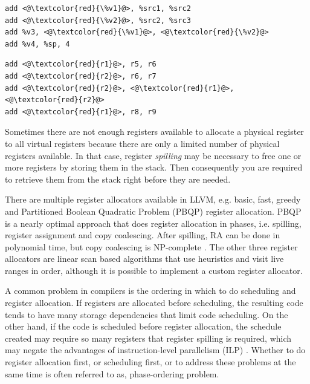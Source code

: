 \begin{center}
\begin{minipage}[t]{.4\textwidth}
\begin{lstlisting}
add <@\textcolor{red}{\%v1}@>, %src1, %src2
add <@\textcolor{red}{\%v2}@>, %src2, %src3
add %v3, <@\textcolor{red}{\%v1}@>, <@\textcolor{red}{\%v2}@>
add %v4, %sp, 4
\end{lstlisting}
\end{minipage}
\begin{minipage}[t]{.4\textwidth}
\begin{lstlisting}
add <@\textcolor{red}{r1}@>, r5, r6
add <@\textcolor{red}{r2}@>, r6, r7
add <@\textcolor{red}{r2}@>, <@\textcolor{red}{r1}@>, <@\textcolor{red}{r2}@>
add <@\textcolor{red}{r1}@>, r8, r9
\end{lstlisting}
\end{minipage}
\label{lst:ra_example}
\end{center}


Sometimes there are not enough registers available to allocate a physical register to all virtual registers because there are only a limited number of physical registers available. In that case, register \emph{spilling} may be necessary to free one or more registers by storing them in the stack. Then consequently you are required to retrieve them from the stack right before they are needed.

There are multiple register allocators available in LLVM, e.g. basic, fast, greedy and Partitioned Boolean Quadratic Problem (PBQP) register allocation. PBQP is a nearly optimal approach that does register allocation in phases, i.e. spilling, register assignment and copy coalescing. After spilling, RA can be done in polynomial time, but copy coalescing is NP-complete \cite{pbqp}. The other three register allocators are linear scan based algorithms that use heuristics and visit live ranges in order, although it is possible to implement a custom register allocator.


A common problem in compilers is the ordering in which to do scheduling and register allocation. If registers are allocated before scheduling, the resulting code tends to have many storage dependencies that limit code scheduling. On the other hand, if the code is scheduled before register allocation, the schedule created may require so many registers that register spilling is required, which may negate the advantages of instruction-level parallelism (ILP) \cite[Chapter~10.2.4]{dragon_book}. Whether to do register allocation first, or scheduling first, or to address these problems at the same time is often referred to as, phase-ordering problem. 

